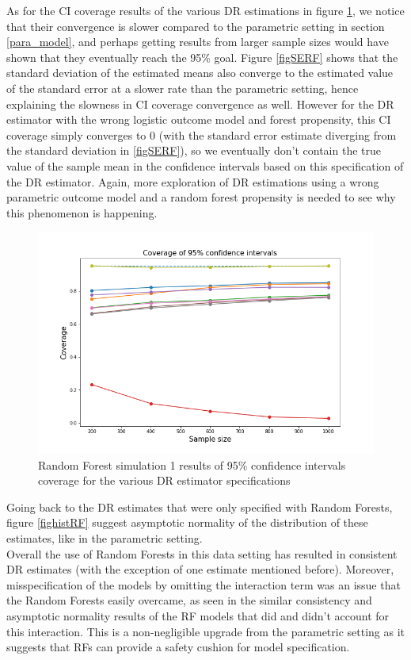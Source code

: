 \documentclass[12pt,twoside]{article}
\begin{document}
As for the CI coverage results of the various DR estimations in figure \ref{figCIRF}, we notice that their convergence is slower compared to the parametric setting in section \ref{para_model}, and perhaps getting results from larger sample sizes would have shown that they eventually reach the 95\% goal. Figure \ref{figSERF} shows that the standard deviation of the estimated means also converge to the estimated value of the standard error at a slower rate than the parametric setting, hence explaining the slowness in CI coverage convergence as well. However for the DR estimator with the wrong logistic outcome model and forest propensity, this CI coverage simply converges to 0 (with the standard error estimate diverging from the standard deviation in \ref{figSERF}), so we eventually don't contain the true value of the sample mean in the confidence intervals based on this specification of the DR estimator. Again, more exploration of DR estimations using a wrong parametric outcome model and a random forest propensity is needed to see why this phenomenon is happening.

\begin{figure}[h!]
    \centering
    \includegraphics[width = 0.9\columnwidth]{figures/CIRF.png}
    \caption{Random Forest simulation 1 results of 95\% confidence intervals coverage for the various DR estimator specifications}
    \label{figCIRF}
\end{figure}

Going back to the DR estimates that were only specified with Random Forests, figure \ref{fighistRF} suggest asymptotic normality of the distribution of these estimates, like in the parametric setting. \\

Overall the use of Random Forests in this data setting has resulted in consistent DR estimates (with the exception of one estimate mentioned before). Moreover, misspecification of the models by omitting the interaction term was an issue that the Random Forests easily overcame, as seen in the similar consistency and asymptotic normality results of the RF models that did and didn't account for this interaction. This is a non-negligible upgrade from the parametric setting as it suggests that RFs can provide a safety cushion for model specification.
\end{document}
